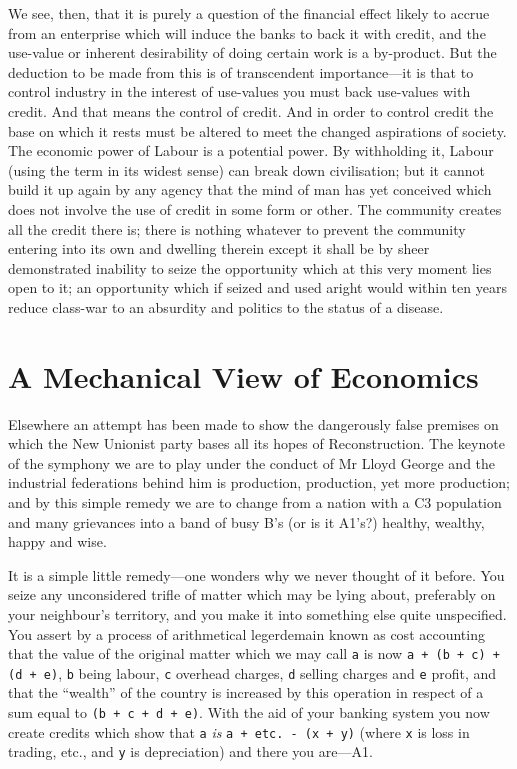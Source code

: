 \documentclass{book}
\newcommand\mdcode[1]{\texttt{#1}}
\begin{document}
We see, then, that it is purely a question of the financial effect likely to accrue from an enterprise which will induce the banks to back it with credit, and the use-value or inherent desirability of doing certain work is a by-product. But the deduction to be made from this is of transcendent importance—it is that to control industry in the interest of use-values you must back use-values with credit. And that means the control of credit. And in order to control credit the base on which it rests must be altered to meet the changed aspirations of society. The economic power of Labour is a potential power. By withholding it, Labour (using the term in its widest sense) can break down civilisation; but it cannot build it up again by any agency that the mind of man has yet conceived which does not involve the use of credit in some form or other. The community creates all the credit there is; there is nothing whatever to prevent the community entering into its own and dwelling therein except it shall be by sheer demonstrated inability to seize the opportunity which at this very moment lies open to it; an opportunity which if seized and used aright would within ten years reduce class-war to an absurdity and politics to the status of a disease.

\chapter{A Mechanical View of Economics}
\label{chapter-4}
Elsewhere an attempt has been made to show the dangerously false premises on which the New Unionist party bases all its hopes of Reconstruction. The keynote of the symphony we are to play under the conduct of Mr Lloyd George and the industrial federations behind him is production, production, yet more production; and by this simple remedy we are to change from a nation with a C3 population and many grievances into a band of busy B’s (or is it A1’s?) healthy, wealthy, happy and wise.

It is a simple little remedy—one wonders why we never thought of it before. You seize any unconsidered trifle of matter which may be lying about, preferably on your neighbour’s territory, and you make it into something else quite unspecified. You assert by a process of arithmetical legerdemain known as cost accounting that the value of the original matter which we may call \mdcode{a} is now \mdcode{a + (\allowbreak{}b + c)\allowbreak{} + (\allowbreak{}d + e)\allowbreak{}}, \mdcode{b} being labour, \mdcode{c} overhead charges, \mdcode{d} selling charges and \mdcode{e} profit, and that the “wealth” of the country is increased by this operation in respect of a sum equal to \mdcode{(\allowbreak{}b + c + d + e)\allowbreak{}}. With the aid of your banking system you now create credits which show that \mdcode{a} \emph{is} \mdcode{a + etc.\allowbreak{} -\allowbreak{} (\allowbreak{}x + y)\allowbreak{}} (where \mdcode{x} is loss in trading, etc., and \mdcode{y} is depreciation) and there you are—A1.
\end{document}
